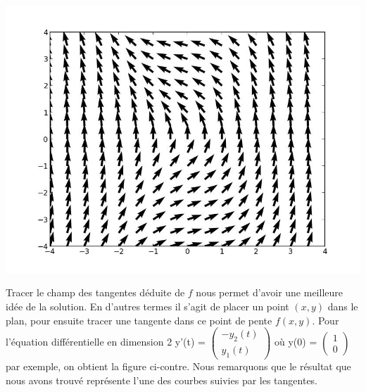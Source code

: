 \begin{minipage}{0.5\textwidth}
\includegraphics[scale = 0.2]{champ.jpg}
\label{elipse}
\end{minipage} \hfill
\begin{minipage}{0.5\textwidth}

Tracer le champ des tangentes déduite de $f$ nous permet d'avoir une meilleure idée de la solution. En d'autres termes il s'agit de placer un point $(x,y)$ dans le plan, pour ensuite tracer une tangente dans ce point de pente $f(x,y)$.
Pour l'équation différentielle en dimension 2  y'(t) = 
$\begin{pmatrix}
   -y_2(t) \\
   y_1 (t) 
\end{pmatrix}$ où y(0) =
$\begin{pmatrix}
   1 \\
   0 
\end{pmatrix} $ par exemple, on obtient la figure ci-contre.
Nous remarquons que le résultat que nous avons trouvé représente l'une des courbes suivies par les tangentes. 


\end{minipage}